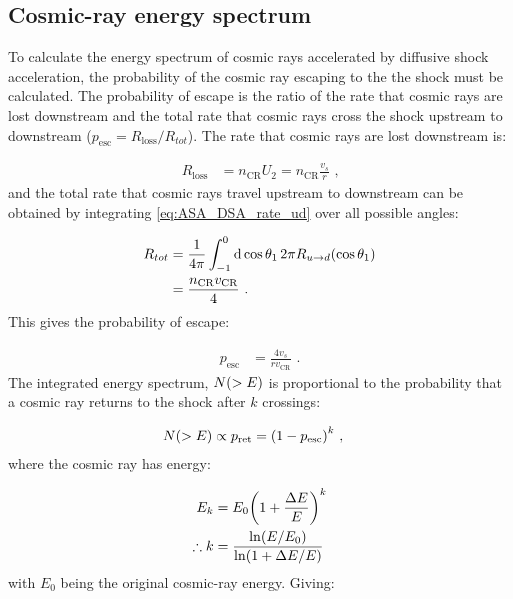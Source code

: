 \subsection{Cosmic-ray energy spectrum}

To calculate the energy spectrum of cosmic rays accelerated by diffusive shock acceleration, the probability of the cosmic ray escaping to the the shock must be calculated. The probability of escape is the ratio of the rate that cosmic rays are lost downstream and the total rate that cosmic rays cross the shock upstream to downstream ($p_\text{esc}=R_\text{loss}/R_{tot}$). The rate that cosmic rays are lost downstream is:

\begin{equation}
    \begin{aligned}
        R_\text{loss}&=n_\text{CR}U_2=n_\text{CR}\frac{v_s}{r}\text{ ,}
    \end{aligned}
\end{equation}
\noindent and the total rate that cosmic rays travel upstream to downstream can be obtained by integrating \autoref{eq:ASA_DSA_rate_ud} over all possible angles:

\begin{equation}
    \begin{aligned}
        R_{tot}&=\frac{1}{4\pi}\int_{-1}^0\dd{\cos\theta_1}2\pi R_{u\rightarrow d}\qty(\cos\theta_1) \\
        &=\frac{n_\text{CR}v_\text{CR}}{4} \text{ .}
    \end{aligned}
\end{equation}
\noindent This gives the probability of escape:

\begin{equation}
    \begin{aligned}
        p_\text{esc}&=\frac{4v_s}{rv_\text{CR}} \text{ .}
    \end{aligned}
\end{equation}
\noindent The integrated energy spectrum, $N\qty(>E)$ is proportional to the probability that a cosmic ray returns to the shock after $k$ crossings:

\begin{equation}
    \begin{aligned}
        N\qty(>E)\propto p_\text{ret}&=\qty(1-p_\text{esc})^k \text{ ,}
    \end{aligned}
\end{equation}
\noindent where the cosmic ray has energy:

\begin{equation}
    \begin{aligned}
        E_k&=E_0\qty(1+\frac{\Delta E}{E})^k \\
        \therefore k&=\frac{\ln(E/E_0)}{\ln(1+\Delta E/E)}
    \end{aligned}
\end{equation}
\noindent with $E_0$ being the original cosmic-ray energy. Giving:

